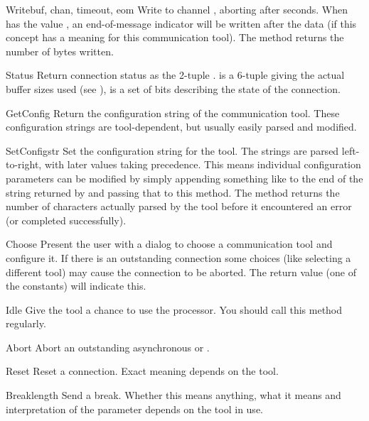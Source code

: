 \begin{methoddesc}[connection]{Write}{buf, chan, timeout, eom}
Write  to channel , aborting after 
seconds. When  has the value , an
end-of-message indicator will be written after the data (if this
concept has a meaning for this communication tool). The method returns
the number of bytes written.
\end{methoddesc}

\begin{methoddesc}[connection]{Status}{}
Return connection status as the 2-tuple .  is a 6-tuple giving the actual buffer sizes used
(see ),  is a set of bits describing the state
of the connection.
\end{methoddesc}

\begin{methoddesc}[connection]{GetConfig}{}
Return the configuration string of the communication tool. These
configuration strings are tool-dependent, but usually easily parsed
and modified.
\end{methoddesc}

\begin{methoddesc}[connection]{SetConfig}{str}
Set the configuration string for the tool. The strings are parsed
left-to-right, with later values taking precedence. This means
individual configuration parameters can be modified by simply appending
something like  to the end of the string returned by
 and passing that to this method. The method returns
the number of characters actually parsed by the tool before it
encountered an error (or completed successfully).
\end{methoddesc}

\begin{methoddesc}[connection]{Choose}{}
Present the user with a dialog to choose a communication tool and
configure it. If there is an outstanding connection some choices (like
selecting a different tool) may cause the connection to be
aborted. The return value (one of the  constants) will
indicate this.
\end{methoddesc}

\begin{methoddesc}[connection]{Idle}{}
Give the tool a chance to use the processor. You should call this
method regularly.
\end{methoddesc}

\begin{methoddesc}[connection]{Abort}{}
Abort an outstanding asynchronous  or .
\end{methoddesc}

\begin{methoddesc}[connection]{Reset}{}
Reset a connection. Exact meaning depends on the tool.
\end{methoddesc}

\begin{methoddesc}[connection]{Break}{length}
Send a break. Whether this means anything, what it means and
interpretation of the  parameter depends on the tool in
use.
\end{methoddesc}
